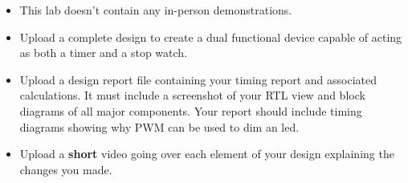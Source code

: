 \begin{itemize}
    \item This lab doesn't contain any in-person demonstrations.
    \item Upload a complete design to create a dual functional device capable of acting as both a timer and a stop watch. 
    \item Upload a design report file containing your timing report and associated calculations. It must include a screenshot of your RTL view and block diagrams of all major components. Your report should include timing diagrams showing why PWM can be used to dim an led.
    \item Upload a \textbf{short} video going over each element of your design explaining the changes you made.
\end{itemize}